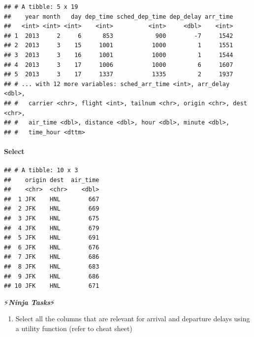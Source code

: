 \documentclass[]{article}
\newenvironment{Shaded}{\begin{snugshade}}{\end{snugshade}}
\newcommand{\KeywordTok}[1]{\textcolor[rgb]{0.13,0.29,0.53}{\textbf{#1}}}
\newcommand{\DataTypeTok}[1]{\textcolor[rgb]{0.13,0.29,0.53}{#1}}
\newcommand{\DecValTok}[1]{\textcolor[rgb]{0.00,0.00,0.81}{#1}}
\newcommand{\StringTok}[1]{\textcolor[rgb]{0.31,0.60,0.02}{#1}}
\newcommand{\OperatorTok}[1]{\textcolor[rgb]{0.81,0.36,0.00}{\textbf{#1}}}
\newcommand{\NormalTok}[1]{#1}
\providecommand{\tightlist}{%
  \setlength{\itemsep}{0pt}\setlength{\parskip}{0pt}}
\let\oldparagraph\paragraph
\renewcommand{\paragraph}[1]{\oldparagraph{#1}\mbox{}}
\begin{document}
\begin{verbatim}
## # A tibble: 5 x 19
##    year month   day dep_time sched_dep_time dep_delay arr_time
##   <int> <int> <int>    <int>          <int>     <dbl>    <int>
## 1  2013     2     6      853            900        -7     1542
## 2  2013     3    15     1001           1000         1     1551
## 3  2013     3    16     1001           1000         1     1544
## 4  2013     3    17     1006           1000         6     1607
## 5  2013     3    17     1337           1335         2     1937
## # ... with 12 more variables: sched_arr_time <int>, arr_delay <dbl>,
## #   carrier <chr>, flight <int>, tailnum <chr>, origin <chr>, dest <chr>,
## #   air_time <dbl>, distance <dbl>, hour <dbl>, minute <dbl>,
## #   time_hour <dttm>
\end{verbatim}

\paragraph{Select}\label{select}

\begin{Shaded}
\end{Shaded}

\begin{verbatim}
## # A tibble: 10 x 3
##    origin dest  air_time
##    <chr>  <chr>    <dbl>
##  1 JFK    HNL        667
##  2 JFK    HNL        669
##  3 JFK    HNL        675
##  4 JFK    HNL        679
##  5 JFK    HNL        691
##  6 JFK    HNL        676
##  7 JFK    HNL        686
##  8 JFK    HNL        683
##  9 JFK    HNL        686
## 10 JFK    HNL        671
\end{verbatim}

⚡\textbf{\emph{Ninja Tasks}}⚡

\begin{enumerate}
\def\labelenumi{\arabic{enumi}.}
\tightlist
\item
  Select all the columns that are relevant for arrival and departure
  delays using a utility function (refer to cheat sheet)
\end{enumerate}
\end{document}
